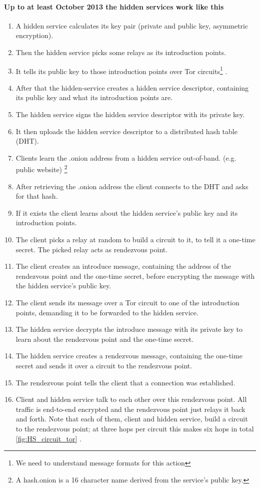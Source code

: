 \paragraph{Up to at least October 2013 the hidden services work like this}

\begin{enumerate}
	\item A hidden service calculates its key pair (private and public key, asymmetric encryption).
	\item Then the hidden service picks some relays as its introduction points.
	\item It tells its public key to those introduction points over Tor circuits\footnote{We need to understand message formats for this action} .
	\item After that the hidden-service creates a hidden service descriptor, containing its public key and what its introduction points are.
	\item The hidden service signs the hidden service descriptor with its private key.
	\item It then uploads the hidden service descriptor to a distributed hash table (DHT).
	\item Clients learn the .onion address from a hidden service out-of-band. (e.g. public website) \footnote{A hash.onion is a 16 character name derived from the service's public key.}
	\item After retrieving the .onion address the client connects to the DHT and asks for that hash.
	\item If it exists the client learns about the hidden service's public key and its introduction points.
	\item The client picks a relay at random to build a circuit to it, to tell it a one-time secret. The picked relay acts as rendezvous point.
	\item The client creates an introduce message, containing the address of the rendezvous point and the one-time secret, before encrypting the message with the hidden service's public key.
	\item The client sends its message over a Tor circuit to one of the introduction points, demanding it to be forwarded to the hidden service.
	\item The hidden service decrypts the introduce message with its private key to learn about the rendezvous point and the one-time secret.
	\item The hidden service creates a rendezvous message, containing the one-time secret and sends it over a circuit to the rendezvous point.
	\item The rendezvous point tells the client that a connection was established.
	\item Client and hidden service talk to each other over this rendezvous point. All traffic is end-to-end encrypted and the rendezvous point just relays it back and forth. Note that each of them, client and hidden service, build a circuit to the rendezvous point; at three hops per circuit this makes six hops in total \ref{fig:HS_circuit_tor} .

\end{enumerate}

